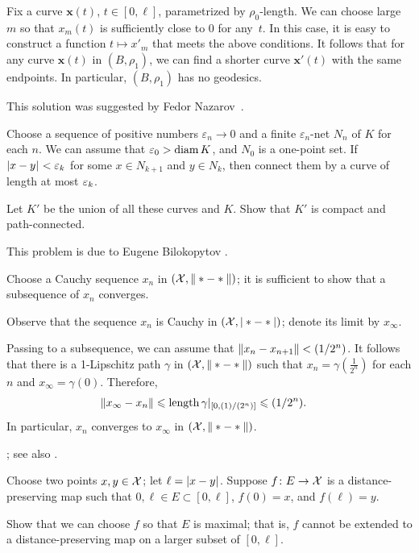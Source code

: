 Fix a curve $\bm{x}(t)$, $t\in[0,\ell]$, parametrized by  $\rho_0$-length.
We can choose large $m$ so that $x_m(t)$ is sufficiently close to $0$ for any~$t$.
In this case, it is easy to construct a function $t\mapsto x'_m$ that meets the above conditions.
It follows that for any curve $\bm{x}(t)$ in $(B,\rho_1)$, we can find a shorter curve $\bm{x}'(t)$ with the same endpoints.
In particular, $(B,\rho_1)$ has no geodesics.

This solution was suggested by Fedor Nazarov~\cite{nazarov}.

Choose a sequence of positive numbers $\varepsilon_n\to 0$ and a finite $\varepsilon_n$-net $N_n$ of $K$ for each $n$.
We can assume that $\varepsilon_0>\operatorname{\rm diam}\nolimits K$, and $N_0$ is a one-point set.
If $\dist{x}{y}{}<\eps_k$ for some $x\in N_{k+1}$ and $y\in N_{k}$, then connect them by a curve of length at most $\varepsilon_k$.

Let $K'$ be the union of all these curves and $K$.
Show that $K'$ is compact and path-connected.

 This problem is due to Eugene Bilokopytov \cite{bilokopytov}.

Choose a Cauchy sequence $x_n$ in $(\spc{X},\|*\z-*\|)$; it is sufficient to show that a subsequence of $x_n$ converges.

Observe that the sequence $x_n$ is Cauchy in $(\mathcal{X},|*-*|)$;
denote its limit by $x_\infty$.

Passing to a subsequence, we can assume that $\|x_n-x_{n+1}\|\z<\tfrac1{2^n}$.
It follows that there is a 1-Lipschitz path $\gamma$ in $(\mathcal{X},\|*-*\|)$ such that $x_n=\gamma(\tfrac1{2^n})$ for each $n$ and $x_\infty=\gamma(0)$.
Therefore,
\begin{align*}
\|x_\infty-x_n\|&\leqslant \mathop{\rm length}\nolimits\gamma|_{[0,(1)/(2^n)]}\leqslant (1/2^n).
\end{align*}
In particular, $x_n$ converges to $x_\infty$ in $(\spc{X},\|*\z-*\|)$.

 \cite[Corollary]{hu-kirk}; see also \cite[Lemma 2.3]{petrunin-stadler}.

 Choose two points $x,y\in \mathcal{X}$;
let $\ell\z=\dist{x}{y}{}$.
Suppose $f\colon E\to \mathcal{X}$ is a distance-preserving map such that $0,\ell\in E\subset [0,\ell]$,
$f(0)=x$, and  $f(\ell)=y$.

Show that we can choose $f$ so that $E$ is maximal;
that is, $f$ cannot be extended to a distance-preserving map on a larger subset of $[0,\ell]$.

